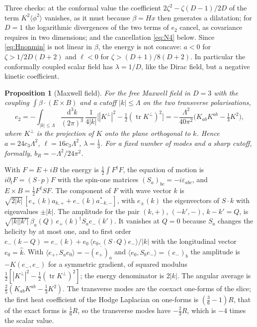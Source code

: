 \documentclass[11pt,a4paper]{article}
\makeatletter
\theoremstyle{stmt}
\newtheorem{proposition}[theorem]{Proposition}
\theoremstyle{defn}
\theoremstyle{rmk}
\renewenvironment{proof}[1][\proofname]{\par\pushQED{\qed}\normalfont\topsep6\p@\@plus6\p@\relax
  \trivlist\item[\hskip\labelsep{\sffamily\itshape\small #1.}]\ignorespaces}{\popQED\endtrivlist\@endpefalse}
\numberwithin{equation}{section}
\newcommand{\dd}{\mathrm{d}}
\makeatother
\begin{document}
Three checks: at the conformal value the coefficient $2\zeta^2-\zeta(D-1)/2D$ of the term $K^2\langle\phi^2\rangle$ vanishes, as it must because $\beta=Hx$ then generates a dilatation; for $D=1$ the logarithmic divergences of the two terms of $e_2$ cancel, as covariance requires in two dimensions; and the cancellation \eqref{eq:N4} below. Since \eqref{eq:Hnonmin} is not linear in $\beta$, the energy is not concave: $a<0$ for $\zeta>1/2D(D+2)$ and $\ell<0$ for $\zeta>(D+1)/8(D+2)$. In particular the conformally coupled scalar field has $\lambda=1/D$, like the Dirac field, but a negative kinetic coefficient.

\begin{proposition}[Maxwell field]\label{prop:maxwell}
For the free Maxwell field in $D=3$ with the coupling $\int\beta\cdot(E\times B)$ and a cutoff $|k|\le\Lambda$ on the two transverse polarisations,
\begin{equation}\label{eq:e2maxwell}
e_2=-\int_{|k|\le\Lambda}\frac{\dd^3k}{(2\pi)^3}\,\frac{1}{4|k|}\Big[|K^\perp|^2-\tfrac12(\operatorname{tr}K^\perp)^2\Big]=-\frac{\Lambda^2}{40\pi^2}\Big(K_{ab}K^{ab}-\tfrac13K^2\Big),
\end{equation}
where $K^\perp$ is the projection of $K$ onto the plane orthogonal to $k$. Hence $a=24c_3\Lambda^2$, $\ell=16c_3\Lambda^2$, $\lambda=\tfrac13$. For a fixed number of modes and a sharp cutoff, formally, $b_R=-\Lambda^2/24\pi^2$.
\end{proposition}

\begin{proof}
With $F=E+iB$ the energy is $\tfrac12\int F^\dagger F$, the equation of motion is $i\partial_tF=(S\cdot p)F$ with the spin-one matrices $(S_a)_{bc}=-i\varepsilon_{abc}$, and $E\times B=\tfrac12F^\dagger SF$. The component of $F$ with wave vector $k$ is $\sqrt{2|k|}\,[e_+(k)a_{k,+}+e_-(k)a^*_{-k,-}]$, with $e_\pm(k)$ the eigenvectors of $S\cdot k$ with eigenvalues $\pm|k|$. The amplitude for the pair $(k,+)$, $(-k',-)$, $k-k'=Q$, is $\sqrt{|k||k'|}\,\beta_a(Q)\,e_+(k)^\dagger S_ae_-(k')$. It vanishes at $Q=0$ because $S_a$ changes the helicity by at most one, and to first order $e_-(k-Q)=e_-(k)+e_0\,\langle e_0,(S\cdot Q)e_-\rangle/|k|$ with the longitudinal vector $e_0=\hat k$. With $\langle e_+,S_ae_0\rangle=-\overline{(e_+)_a}$ and $\langle e_0,S_be_-\rangle=(e_-)_b$ the amplitude is $-K(e_-,e_-)$ for a symmetric gradient, of squared modulus $\tfrac12[|K^\perp|^2-\tfrac12(\operatorname{tr}K^\perp)^2]$; the energy denominator is $2|k|$. The angular average is $\tfrac25(K_{ab}K^{ab}-\tfrac13K^2)$. The transverse modes are the coexact one-forms of the slice; the first heat coefficient of the Hodge Laplacian on one-forms is $(\tfrac36-1)R$, that of the exact forms is $\tfrac16R$, so the transverse modes have $-\tfrac23R$, which is $-4$ times the scalar value.
\end{proof}
\end{document}
